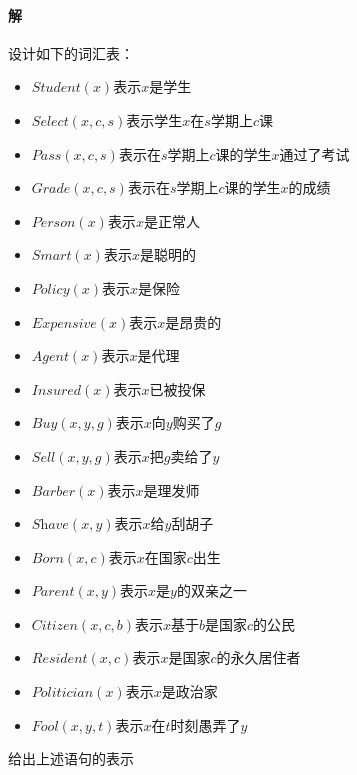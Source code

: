\documentclass{article}
\begin{document}
\paragraph{解}
设计如下的词汇表：
\begin{itemize}
    \item $\textit{Student}(x)$表示$x$是学生
    \item $\textit{Select}(x, c, s)$表示学生$x$在$s$学期上$c$课
    \item $\textit{Pass}(x, c, s)$表示在$s$学期上$c$课的学生$x$通过了考试
    \item $\textit{Grade}(x, c, s)$表示在$s$学期上$c$课的学生$x$的成绩
    \item $\textit{Person}(x)$表示$x$是正常人
    \item $\textit{Smart}(x)$表示$x$是聪明的
    \item $\textit{Policy}(x)$表示$x$是保险
    \item $\textit{Expensive}(x)$表示$x$是昂贵的
    \item $\textit{Agent}(x)$表示$x$是代理
    \item $\textit{Insured}(x)$表示$x$已被投保
    \item $\textit{Buy}(x, y, g)$表示$x$向$y$购买了$g$
    \item $\textit{Sell}(x, y, g)$表示$x$把$g$卖给了$y$
    \item $\textit{Barber}(x)$表示$x$是理发师
    \item $\textit{Shave}(x, y)$表示$x$给$y$刮胡子
    \item $\textit{Born}(x, c)$表示$x$在国家$c$出生
    \item $\textit{Parent}(x, y)$表示$x$是$y$的双亲之一
    \item $\textit{Citizen}(x, c, b)$表示$x$基于$b$是国家$c$的公民
    \item $\textit{Resident}(x, c)$表示$x$是国家$c$的永久居住者
    \item $\textit{Politician}(x)$表示$x$是政治家
    \item $\textit{Fool}(x, y, t)$表示$x$在$t$时刻愚弄了$y$
\end{itemize}
给出上述语句的表示
\end{document}
